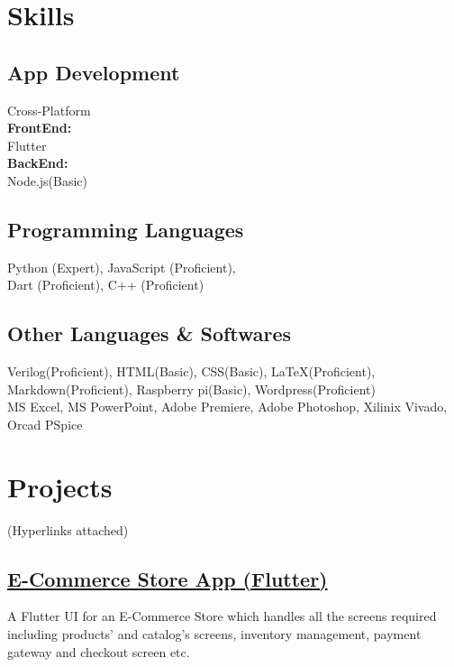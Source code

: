 \documentclass[]{m abbas resume' 2022}
\begin{document}
\begin{minipage}[t]{0.39\textwidth} 
    


\section{Skills}
\subsection{App Development}
Cross-Platform\\
\textbf{FrontEnd:}\\ Flutter \\
\textbf{BackEnd:}\\ Node.js(Basic)\\

\subsection{Programming Languages}
Python (Expert), 
JavaScript (Proficient), \\
Dart (Proficient), 
C++ (Proficient)

\subsection{Other Languages \& Softwares}
Verilog(Proficient), 
HTML(Basic),
CSS(Basic),
LaTeX(Proficient),
Markdown(Proficient), 
Raspberry pi(Basic), 
Wordpress(Proficient) \\

MS Excel, 
MS PowerPoint, 
Adobe Premiere, 
Adobe Photoshop, 
Xilinix Vivado,
Orcad PSpice


\section{Projects}
    (Hyperlinks attached)
    \subsection{\href{}{\textbf{E-Commerce Store App (Flutter)}}}
    A Flutter UI for an E-Commerce Store which handles all the screens required including products' and catalog's screens, inventory management, payment gateway and checkout screen etc.
 

\end{minipage}
\end{document}
